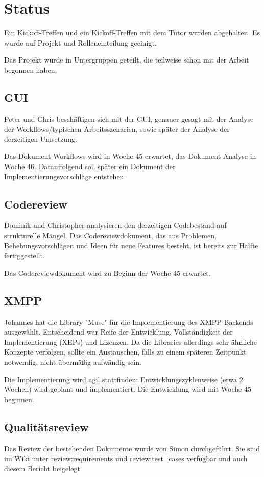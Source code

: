 \setcounter{chapter}{1}
\section{Status}
Ein Kickoff-Treffen und ein Kickoff-Treffen mit dem Tutor wurden abgehalten.
Es wurde auf Projekt und Rolleneinteilung geeinigt.

Das Projekt wurde in Untergruppen geteilt, die teilweise schon mit der Arbeit 
begonnen haben: 

\subsection{GUI}
Peter und Chris beschäftigen sich mit der GUI, genauer gesagt mit der Analyse 
der Workflows/typischen Arbeitsszenarien, sowie später der Analyse der 
derzeitigen Umsetzung. 

Das Dokument Workflows wird in Woche 45 erwartet, das Dokument Analyse in 
Woche 46. Darauffolgend soll später ein Dokument der Implementierungsvorschläge
 entstehen.

\subsection{Codereview}
Dominik und Christopher analysieren den derzeitigen Codebestand auf 
strukturelle Mängel. Das Codereviewdokument, das aus Problemen, 
Behebungsvorschlägen und Ideen für neue Features besteht, ist bereits zur Hälfte 
fertiggestellt.

Das Codereviewdokument wird zu Beginn der Woche 45 erwartet.

\subsection{XMPP}
Johannes hat die Library "Muse" für die Implementierung des XMPP-Backends 
ausgewählt. Entscheidend war Reife der Entwicklung, Vollständigkeit der 
Implementierung (XEPs) und Lizenzen. Da die Libraries allerdings sehr ähnliche
Konzepte verfolgen, sollte ein Austauschen, falls zu einem späteren Zeitpunkt 
notwendig, nicht übermäßig aufwändig sein.

Die Implementierung wird agil stattfinden: Entwicklungszyklenweise (etwa 2 
Wochen) wird geplant und implementiert. Die Entwicklung wird mit Woche 45 
beginnen.

\subsection{Qualitätsreview}
Das Review der bestehenden Dokumente wurde von Simon durchgeführt. Sie sind im 
Wiki unter review:requirements und review:test\_cases verfügbar und auch diesem 
Bericht beigelegt.

